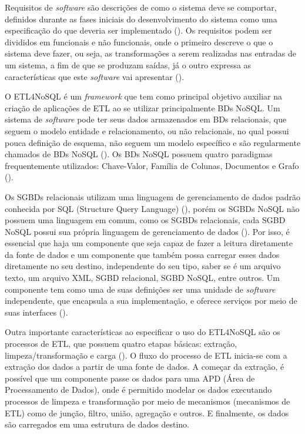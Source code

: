 Requisitos de \textit{software} são descrições de como o sistema deve se comportar, definidos durante as fases iniciais do desenvolvimento do sistema como uma especificação do que deveria ser implementado (\cite{sommerville:2013}). Os requisitos podem ser divididos em funcionais e não funcionais, onde o primeiro descreve o que o sistema deve fazer, ou seja, as transformações a serem realizadas nas entradas de um sistema, a fim de que se produzam saídas, já o outro expressa as características que este \textit{software} vai apresentar (\cite{sommerville:2013}). 

O ETL4NoSQL é um \textit{framework} que tem como principal objetivo auxiliar na criação de aplicações de ETL ao se utilizar principalmente BDs NoSQL. Um sistema de \textit{software} pode ter seus dados armazenados em BDs relacionais, que seguem o modelo entidade e relacionamento, ou não relacionais, no qual possui pouca definição de esquema, não seguem um modelo específico e são regularmente chamados de BDs NoSQL (\cite{fowler:2013}). Os BDs NoSQL possuem quatro paradigmas frequentemente utilizados: Chave-Valor, Família de Colunas, Documentos e Grafo (\cite{fowler:2013}).

Os SGBDs relacionais utilizam uma linguagem de gerenciamento de dados padrão conhecida por SQL (Structure Query Language) (\cite{fowler:2013}), porém os SGBDs NoSQL não possuem uma linguagem em comum, como os SGBDs relacionais, cada SGBD NoSQL possui sua própria linguagem de gerenciamento de dados (\cite{fowler:2013}). Por isso, é essencial que haja um componente que seja capaz de fazer a leitura diretamente da fonte de dados e um componente que também possa carregar esses dados diretamente no seu destino, independente do seu tipo, saber se é um arquivo texto, um arquivo XML, SGBD relacional, SGBD NoSQL, entre outros. Um componente tem como uma de suas definições ser uma unidade de \textit{software} independente, que encapsula a sua implementação, e oferece serviços por meio de suas interfaces (\cite{itana:2005}).

Outra importante características ao especificar o uso do ETL4NoSQL são os processos de ETL, que possuem quatro etapas básicas: extração, limpeza/transformação e carga (\cite{kimball:2004}). O fluxo do processo de ETL inicia-se com a extração dos dados a partir de uma fonte de dados. A começar da extração, é possível que um componente passe os dados para uma APD (Área de Processamento de Dados), onde é permitido modelar os dados executando processos de limpeza e transformação por meio de mecanismos (mecanismos de ETL) como de junção, filtro, união, agregação e outros. E finalmente, os dados são carregados em uma estrutura de dados destino.

